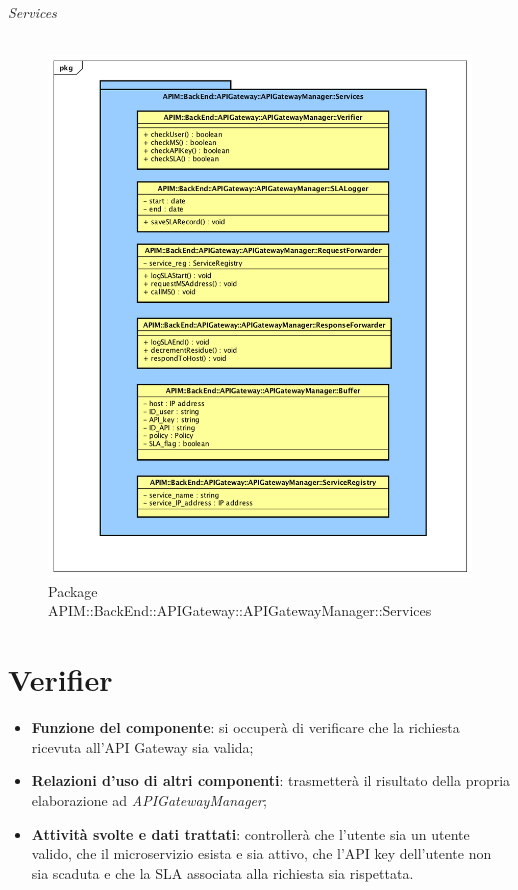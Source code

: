 \subparagraph{Services}
\begin{figure}[H]
	\centering
	\includegraphics[scale=0.45]{UML/DiagrammiPackage/APIGatewayManagerServices.png}
	\caption{Package APIM::BackEnd::APIGateway::APIGatewayManager::Services}
\end{figure}
\FloatBarrier

\chapter{\textbf{Verifier}}
\begin{itemize}
	\item \textbf{Funzione del componente}: si occuperà di verificare che la richiesta ricevuta all'API Gateway sia valida;
	\item \textbf{Relazioni d'uso di altri componenti}: trasmetterà il risultato della propria elaborazione ad \textit{APIGatewayManager};
	\item \textbf{Attività svolte e dati trattati}: controllerà che l'utente sia un utente valido, che il microservizio esista e sia attivo, che l'API key dell'utente non sia scaduta e che la SLA associata alla richiesta sia rispettata.
\end{itemize}

